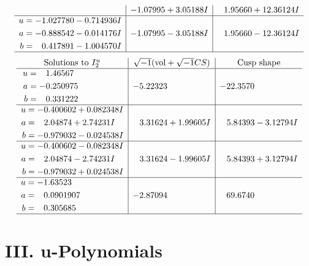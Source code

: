 \documentclass[1p]{elsarticle_modified}
\theoremstyle{definition}
\newcommand{\I}{\sqrt{-1}}
\begin{document}
$$\begin{array}{c|c|c}
 & -1.07995 + 3.05188 I & \phantom{-}1.95660 + 12.36124 I \\ \hline\begin{aligned}
u &= -1.027780 - 0.714936 I \\
a &= -0.888542 - 0.014176 I \\
b &= \phantom{-}0.417891 - 1.004570 I\end{aligned}
 & -1.07995 - 3.05188 I & \phantom{-}1.95660 - 12.36124 I\\
 \hline 
 \end{array}$$\newpage$$\begin{array}{c|c|c}  
\text{Solutions to }I^u_{2}& \I (\text{vol} + \sqrt{-1}CS) & \text{Cusp shape}\\
 \hline 
\begin{aligned}
u &= \phantom{-}1.46567\phantom{ +0.000000I} \\
a &= -0.250975\phantom{ +0.000000I} \\
b &= \phantom{-}0.331222\phantom{ +0.000000I}\end{aligned}
 & -5.22323\phantom{ +0.000000I} & -22.3570\phantom{ +0.000000I} \\ \hline\begin{aligned}
u &= -0.400602 + 0.082348 I \\
a &= \phantom{-}2.04874 + 2.74231 I \\
b &= -0.979032 - 0.024538 I\end{aligned}
 & \phantom{-}3.31624 + 1.99605 I & \phantom{-}5.84393 - 3.12794 I \\ \hline\begin{aligned}
u &= -0.400602 - 0.082348 I \\
a &= \phantom{-}2.04874 - 2.74231 I \\
b &= -0.979032 + 0.024538 I\end{aligned}
 & \phantom{-}3.31624 - 1.99605 I & \phantom{-}5.84393 + 3.12794 I \\ \hline\begin{aligned}
u &= -1.63523\phantom{ +0.000000I} \\
a &= \phantom{-}0.0901907\phantom{ +0.000000I} \\
b &= \phantom{-}0.305685\phantom{ +0.000000I}\end{aligned}
 & -2.87094\phantom{ +0.000000I} & \phantom{-}69.6740\phantom{ +0.000000I}\\
 \hline 
 \end{array}$$\newpage
\newpage\renewcommand{\arraystretch}{1}
\centering \section*{ III. u-Polynomials}
\end{document}
